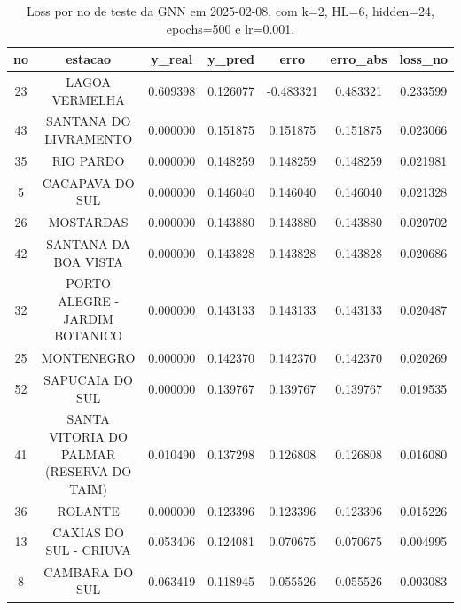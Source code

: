 \begin{table}[h]
\centering
\caption{Loss por no de teste da GNN em 2025-02-08, com k=2, HL=6, hidden=24, epochs=500 e lr=0.001.}
\label{tab:gnn_loss_k2_hl6_h24_e500_d20250208}
\begin{tabular}{ccccccc}
\toprule
no & estacao & y\_real & y\_pred & erro & erro\_abs & loss\_no \\
\midrule
23 & LAGOA VERMELHA & 0.609398 & 0.126077 & -0.483321 & 0.483321 & 0.233599 \\
43 & SANTANA DO LIVRAMENTO & 0.000000 & 0.151875 & 0.151875 & 0.151875 & 0.023066 \\
35 & RIO PARDO & 0.000000 & 0.148259 & 0.148259 & 0.148259 & 0.021981 \\
5 & CACAPAVA DO SUL & 0.000000 & 0.146040 & 0.146040 & 0.146040 & 0.021328 \\
26 & MOSTARDAS & 0.000000 & 0.143880 & 0.143880 & 0.143880 & 0.020702 \\
42 & SANTANA DA BOA VISTA & 0.000000 & 0.143828 & 0.143828 & 0.143828 & 0.020686 \\
32 & PORTO ALEGRE - JARDIM BOTANICO & 0.000000 & 0.143133 & 0.143133 & 0.143133 & 0.020487 \\
25 & MONTENEGRO & 0.000000 & 0.142370 & 0.142370 & 0.142370 & 0.020269 \\
52 & SAPUCAIA DO SUL & 0.000000 & 0.139767 & 0.139767 & 0.139767 & 0.019535 \\
41 & SANTA VITORIA DO PALMAR (RESERVA DO TAIM) & 0.010490 & 0.137298 & 0.126808 & 0.126808 & 0.016080 \\
36 & ROLANTE & 0.000000 & 0.123396 & 0.123396 & 0.123396 & 0.015226 \\
13 & CAXIAS DO SUL - CRIUVA & 0.053406 & 0.124081 & 0.070675 & 0.070675 & 0.004995 \\
8 & CAMBARA DO SUL & 0.063419 & 0.118945 & 0.055526 & 0.055526 & 0.003083 \\
\bottomrule
\end{tabular}
\end{table}

